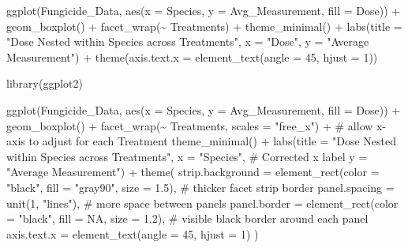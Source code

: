 \documentclass[
  10pt,
  letterpaper,
  twocolumn]{article}
\newenvironment{Shaded}{\begin{snugshade}}{\end{snugshade}}
\newcommand{\AttributeTok}[1]{\textcolor[rgb]{0.40,0.45,0.13}{#1}}
\newcommand{\CommentTok}[1]{\textcolor[rgb]{0.37,0.37,0.37}{#1}}
\newcommand{\ConstantTok}[1]{\textcolor[rgb]{0.56,0.35,0.01}{#1}}
\newcommand{\DecValTok}[1]{\textcolor[rgb]{0.68,0.00,0.00}{#1}}
\newcommand{\FloatTok}[1]{\textcolor[rgb]{0.68,0.00,0.00}{#1}}
\newcommand{\FunctionTok}[1]{\textcolor[rgb]{0.28,0.35,0.67}{#1}}
\newcommand{\NormalTok}[1]{\textcolor[rgb]{0.00,0.23,0.31}{#1}}
\newcommand{\SpecialCharTok}[1]{\textcolor[rgb]{0.37,0.37,0.37}{#1}}
\newcommand{\StringTok}[1]{\textcolor[rgb]{0.13,0.47,0.30}{#1}}
\begin{document}
\begin{Shaded}
\begin{Highlighting}[]
\FunctionTok{ggplot}\NormalTok{(Fungicide\_Data, }\FunctionTok{aes}\NormalTok{(}\AttributeTok{x =}\NormalTok{ Species, }\AttributeTok{y =}\NormalTok{ Avg\_Measurement, }\AttributeTok{fill =}\NormalTok{ Dose)) }\SpecialCharTok{+}
  \FunctionTok{geom\_boxplot}\NormalTok{() }\SpecialCharTok{+}
  \FunctionTok{facet\_wrap}\NormalTok{(}\SpecialCharTok{\textasciitilde{}}\NormalTok{ Treatments) }\SpecialCharTok{+}
  \FunctionTok{theme\_minimal}\NormalTok{() }\SpecialCharTok{+}
  \FunctionTok{labs}\NormalTok{(}\AttributeTok{title =} \StringTok{"Dose Nested within Species across Treatments"}\NormalTok{,}
       \AttributeTok{x =} \StringTok{"Dose"}\NormalTok{,}
       \AttributeTok{y =} \StringTok{"Average Measurement"}\NormalTok{) }\SpecialCharTok{+}
  \FunctionTok{theme}\NormalTok{(}\AttributeTok{axis.text.x =} \FunctionTok{element\_text}\NormalTok{(}\AttributeTok{angle =} \DecValTok{45}\NormalTok{, }\AttributeTok{hjust =} \DecValTok{1}\NormalTok{))}

\FunctionTok{library}\NormalTok{(ggplot2)}

\FunctionTok{ggplot}\NormalTok{(Fungicide\_Data, }\FunctionTok{aes}\NormalTok{(}\AttributeTok{x =}\NormalTok{ Species, }\AttributeTok{y =}\NormalTok{ Avg\_Measurement, }\AttributeTok{fill =}\NormalTok{ Dose)) }\SpecialCharTok{+}
  \FunctionTok{geom\_boxplot}\NormalTok{() }\SpecialCharTok{+}
  \FunctionTok{facet\_wrap}\NormalTok{(}\SpecialCharTok{\textasciitilde{}}\NormalTok{ Treatments, }\AttributeTok{scales =} \StringTok{"free\_x"}\NormalTok{) }\SpecialCharTok{+}  \CommentTok{\# allow x{-}axis to adjust for each Treatment}
  \FunctionTok{theme\_minimal}\NormalTok{() }\SpecialCharTok{+}
  \FunctionTok{labs}\NormalTok{(}\AttributeTok{title =} \StringTok{"Dose Nested within Species across Treatments"}\NormalTok{,}
       \AttributeTok{x =} \StringTok{"Species"}\NormalTok{,  }\CommentTok{\# Corrected x label}
       \AttributeTok{y =} \StringTok{"Average Measurement"}\NormalTok{) }\SpecialCharTok{+}
  \FunctionTok{theme}\NormalTok{(}
    \AttributeTok{strip.background =} \FunctionTok{element\_rect}\NormalTok{(}\AttributeTok{color =} \StringTok{"black"}\NormalTok{, }\AttributeTok{fill =} \StringTok{"gray90"}\NormalTok{, }\AttributeTok{size =} \FloatTok{1.5}\NormalTok{), }\CommentTok{\# thicker facet strip border}
    \AttributeTok{panel.spacing =} \FunctionTok{unit}\NormalTok{(}\DecValTok{1}\NormalTok{, }\StringTok{"lines"}\NormalTok{),  }\CommentTok{\# more space between panels}
    \AttributeTok{panel.border =} \FunctionTok{element\_rect}\NormalTok{(}\AttributeTok{color =} \StringTok{"black"}\NormalTok{, }\AttributeTok{fill =} \ConstantTok{NA}\NormalTok{, }\AttributeTok{size =} \FloatTok{1.2}\NormalTok{),  }\CommentTok{\# visible black border around each panel}
    \AttributeTok{axis.text.x =} \FunctionTok{element\_text}\NormalTok{(}\AttributeTok{angle =} \DecValTok{45}\NormalTok{, }\AttributeTok{hjust =} \DecValTok{1}\NormalTok{)}
\NormalTok{  )}


\end{Highlighting}
\end{Shaded}
\end{document}
